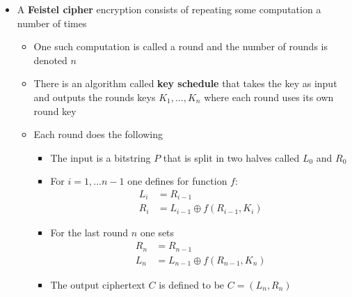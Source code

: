 \begin{itemize}
  \item A \textbf{Feistel cipher} encryption consists of repeating some computation a number of times
  \begin{itemize}
  	\item One such computation is called a round and the number of rounds is denoted $n$
  	\item There is an algorithm called \textbf{key schedule} that takes the key as input and outputs the rounds keys $K_1, \dots, K_n$ where each round uses its own round key
  	\item Each round does the following
    \begin{itemize}
  		\item The input is a bitstring $P$ that is split in two halves called $L_0$ and $R_0$
  		\item For $i=1, \dots n-1$ one defines for function $f$: 
      \begin{align*}
        L_i &= R_{i-1} \\
        R_i &= L_{i-1} \oplus f(R_{i-1}, K_i)
      \end{align*}
  		\item For the last round $n$ one sets 
      \begin{align*}
        R_n &= R_{n-1} \\
        L_n &= L_{n-1} \oplus f(R_{n-1}, K_n) 
      \end{align*}
  		\item The output ciphertext $C$ is defined to be $C=(L_n, R_n)$
    \end{itemize}
  \end{itemize}


\end{itemize}
